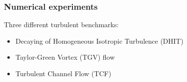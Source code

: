 \begin{frame}[t]
\frametitle{Numerical experiments}
\vfill
Three different turbulent benchmarks:
\begin{itemize}
\item Decaying of Homogeneous Isotropic Turbulence (DHIT)
\item Taylor-Green Vortex (TGV) flow
\item Turbulent Channel Flow (TCF)
\end{itemize}
\vfill
\end{frame}